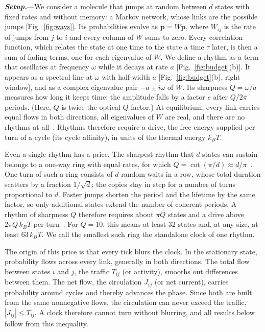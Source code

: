 \documentclass[aps,prl,twocolumn,superscriptaddress,amsmath,amssymb,floatfix,longbibliography]{revtex4-2}
\newcommand{\runin}[1]{\textit{\textbf{#1}}---}
\begin{document}
\runin{Setup.}We consider a molecule that jumps at random between $d$ states with fixed rates and without memory: a Markov network, whose links are the possible jumps [Fig.~\ref{fig:ways}]. Its probabilities evolve as $\dot{\bm p}=W\bm p$, where $W_{ij}$ is the rate of jumps from $j$ to $i$ and every column of $W$ sums to zero. Every correlation function, which relates the state at one time to the state a time $\tau$ later, is then a sum of fading terms, one for each eigenvalue of $W$. We define a rhythm as a term that oscillates at frequency $\omega$ while it decays at rate $a$ [Fig.~\ref{fig:budget}(b)]. It appears as a spectral line at $\omega$ with half-width $a$ [Fig.~\ref{fig:budget}(b), right window], and as a complex eigenvalue pair $-a\pm i\omega$ of $W$. Its sharpness $Q=\omega/a$ measures how long it keeps time: the amplitude falls by a factor $e$ after $Q/2\pi$ periods. (Here, $Q$ is twice the optical $Q$ factor.) At equilibrium, every link carries equal flows in both directions, all eigenvalues of $W$ are real, and there are no rhythms at all~\cite{qian2000}. Rhythms therefore require a drive, the free energy supplied per turn of a cycle (its cycle affinity), in units of the thermal energy $k_BT$.

Even a single rhythm has a price. The sharpest rhythm that $d$ states can sustain belongs to a one-way ring with equal rates, for which $Q=\cot(\pi/d)\approx d/\pi$~\cite{dmitriev1946,karpelevich1951,runnenburg1962,kellogg1978}. One turn of such a ring consists of $d$ random waits in a row, whose total duration scatters by a fraction $1/\sqrt d$; the copies stay in step for a number of turns proportional to $d$. Faster jumps shorten the period and the lifetime by the same factor, so only additional states extend the number of coherent periods. A rhythm of sharpness $Q$ therefore requires about $\pi Q$ states and a drive above $2\pi Q\,k_BT$ per turn~\cite{barato2017,ohga2023}. For $Q=10$, this means at least 32 states and, at any size, at least $63\,k_BT$. We call the smallest such ring the standalone clock of one rhythm.

The origin of this price is that every tick blurs the clock. In the stationary state, probability flows across every link, generally in both directions. The total flow between states $i$ and $j$, the traffic $T_{ij}$ (or activity), smooths out differences between them. The net flow, the circulation $J_{ij}$ (or net current), carries probability around cycles and thereby advances the phase. Since both are built from the same nonnegative flows, the circulation can never exceed the traffic, $|J_{ij}|\le T_{ij}$. A clock therefore cannot turn without blurring, and all results below follow from this inequality.
\end{document}
